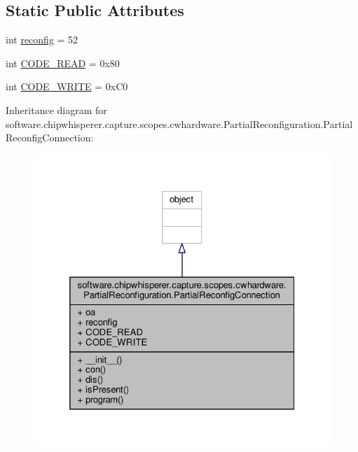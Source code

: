 \subsection*{Static Public Attributes}
\begin{DoxyCompactItemize}
\item 
int \hyperlink{classsoftware_1_1chipwhisperer_1_1capture_1_1scopes_1_1cwhardware_1_1PartialReconfiguration_1_1PartialReconfigConnection_a089235cff76fde763c21b9aabe9873f5}{reconfig} = 52
\item 
int \hyperlink{classsoftware_1_1chipwhisperer_1_1capture_1_1scopes_1_1cwhardware_1_1PartialReconfiguration_1_1PartialReconfigConnection_a600d0340e65b6874b41237c4cc39c781}{C\+O\+D\+E\+\_\+\+R\+E\+A\+D} = 0x80
\item 
int \hyperlink{classsoftware_1_1chipwhisperer_1_1capture_1_1scopes_1_1cwhardware_1_1PartialReconfiguration_1_1PartialReconfigConnection_a6bab5f476e2cc0a0237b6973bcb6713d}{C\+O\+D\+E\+\_\+\+W\+R\+I\+T\+E} = 0x\+C0
\end{DoxyCompactItemize}


Inheritance diagram for software.\+chipwhisperer.\+capture.\+scopes.\+cwhardware.\+Partial\+Reconfiguration.\+Partial\+Reconfig\+Connection\+:\nopagebreak
\begin{figure}[H]
\begin{center}
\leavevmode
\includegraphics[width=325pt]{df/d5c/classsoftware_1_1chipwhisperer_1_1capture_1_1scopes_1_1cwhardware_1_1PartialReconfiguration_1_1P8ebf9f743d002014767c802d34d7ba32}
\end{center}
\end{figure}


